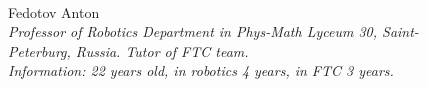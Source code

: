 \begin{figure}[H]
	\begin{minipage}[h]{0.47\linewidth}
		\\
	\end{minipage}
	\hfill
	\begin{minipage}{0.47\linewidth}
		Fedotov Anton \\ 
		\emph{Professor of Robotics Department in Phys-Math Lyceum 30, Saint-Peterburg, Russia. Tutor of FTC team. \\}
		\emph{Information: 22 years old, in robotics 4 years, in FTC 3 years.}
	\end{minipage}	
	\vfill 
\end{figure}

